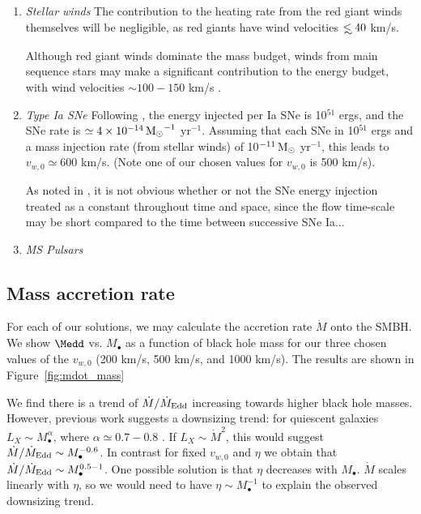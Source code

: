 \documentclass[usenatbib,fleqn]{mn2e}
\newcommand{\eddr}{\dot{M}/\dot{M}_{\rm Edd}}
\newcommand\lsim{\mathrel{\rlap{\lower4pt\hbox{\hskip1pt$\sim$}}
        \raise1pt\hbox{$<$}}}
\newcommand{\Mbh}[1][]{M_{\bullet#1}}
\newcommand{\vwO}{v_{w,0}}
\begin{document}
\begin{enumerate}
\item \emph{Stellar winds} The contribution to the heating rate from the red giant winds themselves will be negligible, as red giants have wind velocities $\lsim 40$ km/s.

Although red giant winds dominate the mass budget, winds from main sequence stars may make a significant contribution to the energy budget, with wind velocities $\sim 100-150$ km/s \citep{NaimanSoares-Furtado+:2013a}. 

\item \emph{Type Ia SNe} Following \citealt{ShcherbakovWong+:2014a}, the energy injected per Ia SNe is 10$^{51}$ ergs, and the SNe rate is $\simeq 4 \times 10^{-14} \,{\rm M_\odot}^{-1}$ yr$^{-1}$.  Assuming that each SNe in 10$^{51}$ ergs and a mass injection rate (from stellar winds) of 10$^{-11} \,{\rm M_\odot}$  yr$^{-1}$, this leads to $\vwO\simeq 600$ km/s.  (Note one of our chosen values for $\vwO$ is 500 km/s).

As noted in \citealt{ShcherbakovWong+:2014a}, it is not obvious whether or not the SNe energy injection treated as a constant throughout time and space, since the flow time-scale may be short compared to the time between successive SNe Ia...
\item \emph{MS Pulsars} 
\end{enumerate}

\subsection{Mass accretion rate}
For each of our solutions, we may calculate the accretion rate $\dot{M}$ onto the SMBH. We show $\Medd$ vs. $\Mbh$ as a function of black hole mass for our three  chosen values of the $\vwO$ (200 km/s, 500 km/s, and 1000 km/s). The results are shown in Figure~\ref{fig:mdot_mass}

We find there is a trend of $\eddr$ increasing towards higher black hole masses. However, previous work  suggests a downsizing trend: for quiescent galaxies $L_X \sim \Mbh^\alpha$, where $\alpha\simeq 0.7-0.8$ \citep{Miller+:2013a}. If $L_X\sim\dot{M}^2$, this would suggest $\eddr\sim \Mbh^{-0.6}$. In contrast for fixed $\vwO$ and $\eta$ we obtain that $\eddr\sim \Mbh^{0.5-1}$. One possible solution is that $\eta$ decreases with $\Mbh$. $\dot{M}$ scales linearly with $\eta$, so we would need to have $\eta\sim \Mbh^{-1}$ to explain the observed downsizing trend.  
\end{document}
